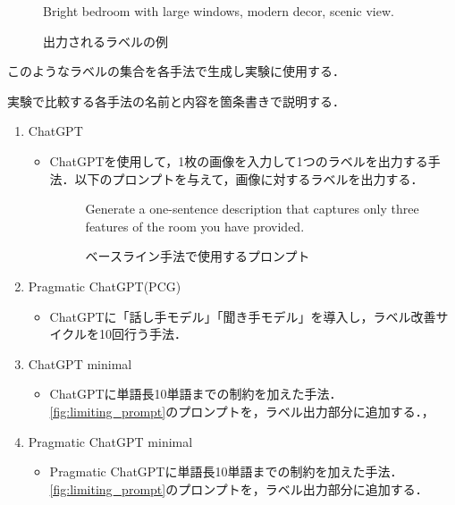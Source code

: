 \documentclass[a4paper,11pt]{jreport}
\begin{document}
\begin{figure}[H]
\begin{mdframed}[linewidth=1pt]
Bright bedroom with large windows, modern decor, scenic view.
\end{mdframed}
\caption{出力されるラベルの例}
\label{fig:label_example}
\end{figure}

このようなラベルの集合を各手法で生成し実験に使用する．

実験で比較する各手法の名前と内容を箇条書きで説明する．

\begin{enumerate}
  \item ChatGPT
  \begin{itemize}
  \item ChatGPTを使用して，1枚の画像を入力して1つのラベルを出力する手法．以下のプロンプトを与えて，画像に対するラベルを出力する．
  \begin{figure}[H]
    \begin{mdframed}[linewidth=1pt]
      Generate a one-sentence description that captures only three features of the room you have provided.
    \end{mdframed}
    \caption{ベースライン手法で使用するプロンプト}
    \label{fig:baseline_prompt}
  \end{figure}
\end{itemize}
  
  \item Pragmatic ChatGPT(PCG)
  \begin{itemize}
    \item ChatGPTに「話し手モデル」「聞き手モデル」を導入し，ラベル改善サイクルを10回行う手法．
  \end{itemize}
    
  \item ChatGPT minimal
  \begin{itemize}
    \item ChatGPTに単語長10単語までの制約を加えた手法．\ref{fig:limiting_prompt}のプロンプトを，ラベル出力部分に追加する．，
  \end{itemize}
  
  \item Pragmatic ChatGPT minimal
  \begin{itemize}
    \item Pragmatic ChatGPTに単語長10単語までの制約を加えた手法．\ref{fig:limiting_prompt}のプロンプトを，ラベル出力部分に追加する．
  \end{itemize}
  
\end{enumerate}
\end{document}
